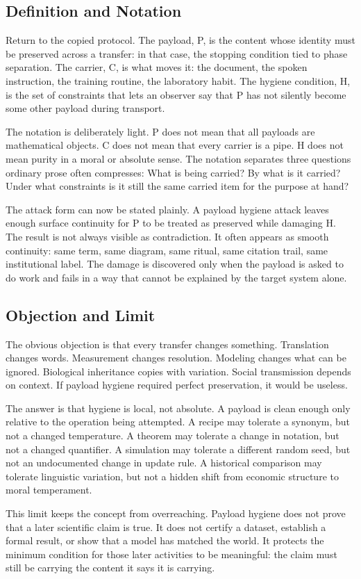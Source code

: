 \documentclass[11pt,a4paper,openany]{book}
\begin{document}
\subsection{Definition and Notation}
Return to the copied protocol. The payload, P, is the content whose identity must be preserved across a transfer: in that case, the stopping condition tied to phase separation. The carrier, C, is what moves it: the document, the spoken instruction, the training routine, the laboratory habit. The hygiene condition, H, is the set of constraints that lets an observer say that P has not silently become some other payload during transport. \cite{prigogine_dissipative,haken_synergetics}\par
The notation is deliberately light. P does not mean that all payloads are mathematical objects. C does not mean that every carrier is a pipe. H does not mean purity in a moral or absolute sense. The notation separates three questions ordinary prose often compresses: What is being carried? By what is it carried? Under what constraints is it still the same carried item for the purpose at hand?\par
The attack form can now be stated plainly. A payload hygiene attack leaves enough surface continuity for P to be treated as preserved while damaging H. The result is not always visible as contradiction. It often appears as smooth continuity: same term, same diagram, same ritual, same citation trail, same institutional label. The damage is discovered only when the payload is asked to do work and fails in a way that cannot be explained by the target system alone.\par
\subsection{Objection and Limit}
The obvious objection is that every transfer changes something. Translation changes words. Measurement changes resolution. Modeling changes what can be ignored. Biological inheritance copies with variation. Social transmission depends on context. If payload hygiene required perfect preservation, it would be useless. \cite{prigogine_dissipative,haken_synergetics}\par
The answer is that hygiene is local, not absolute. A payload is clean enough only relative to the operation being attempted. A recipe may tolerate a synonym, but not a changed temperature. A theorem may tolerate a change in notation, but not a changed quantifier. A simulation may tolerate a different random seed, but not an undocumented change in update rule. A historical comparison may tolerate linguistic variation, but not a hidden shift from economic structure to moral temperament.\par
This limit keeps the concept from overreaching. Payload hygiene does not prove that a later scientific claim is true. It does not certify a dataset, establish a formal result, or show that a model has matched the world. It protects the minimum condition for those later activities to be meaningful: the claim must still be carrying the content it says it is carrying.\par
\end{document}
